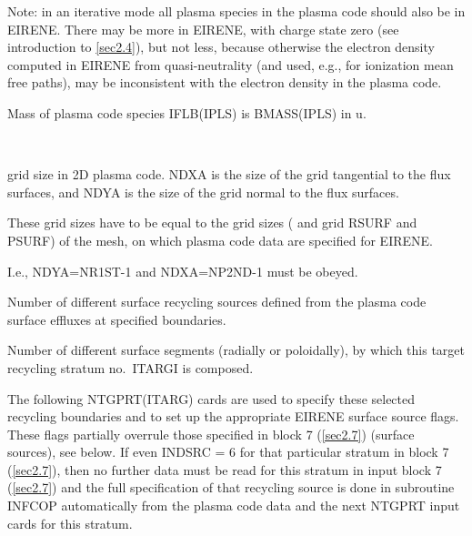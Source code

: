 \begin{description}
        Note: in an iterative mode all plasma species in the plasma code should also be
        in EIRENE.
        There may be more in EIRENE, with charge state zero (see introduction to
        \cref{sec2.4}), but not less, because otherwise the electron density computed
        in EIRENE from quasi-neutrality (and used, e.g., for ionization mean free
        paths), may be inconsistent with the electron density in the plasma code.
  \item[BMASS] Mass of plasma code species IFLB(IPLS) is BMASS(IPLS) in
        \si{\atomicmassunit}.
  \item[NDXA,NDYA] ~

        grid size in 2D plasma code.
        NDXA is the size of the grid tangential to the flux surfaces, and NDYA is the
        size of the grid normal to the flux surfaces.

        These grid sizes have to be equal to the grid sizes ( and
         grid RSURF and PSURF) of the mesh, on which plasma code data are
        specified for EIRENE.

        I.e., NDYA=NR1ST-1 and NDXA=NP2ND-1 must be obeyed.
  \item[NTARGI] Number of different surface recycling sources defined from the
        plasma code surface effluxes at specified boundaries.
  \item[NTGPRT] Number of different surface segments (radially or poloidally), by
        which this target recycling stratum no.\ ITARGI is composed.
\end{description}

The following NTGPRT(ITARG) cards are used to specify these selected recycling
boundaries and to set up the appropriate EIRENE surface source flags.
These flags partially overrule those specified in block 7 (\cref{sec2.7})
(surface sources), see below.
If even INDSRC = 6 for that particular stratum in block 7 (\cref{sec2.7}), then
no further data must be read for this stratum in input block 7 (\cref{sec2.7})
and the full specification of that recycling source is done in subroutine
INFCOP automatically from the plasma code data and the next NTGPRT input cards
for this stratum.

